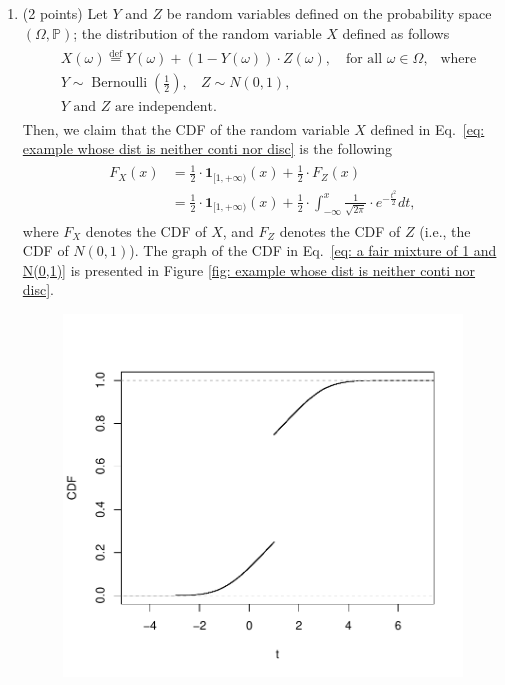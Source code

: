 \documentclass[11pt]{article}
\newcommand{\1}{\mathbbm{1}}
\begin{document}
\begin{enumerate}
\item (2 points) Let $Y$ and $Z$ be random variables defined on the probability space $(\Omega,\mathbb{P})$; the distribution of the random variable $X$ defined as follows
\begin{align}\label{eq: example whose dist is neither conti nor disc}
    \begin{aligned}
    & X(\omega) \overset{\operatorname{def}}{=} Y(\omega)+(1-Y(\omega))\cdot Z(\omega), \ \ \ \text{ for all }\omega\in\Omega,\ \ \mbox{ where} \\
    & Y\sim \operatorname{Bernoulli}\left(\frac{1}{2}\right), \ \ \ \ Z\sim N(0,1), \\
    &\text{$Y$ and $Z$ are independent.}
    \end{aligned}
 \end{align}
Then, we claim that the CDF of the random variable $X$ defined in Eq.~\eqref{eq: example whose dist is neither conti nor disc} is the following
\begin{align}\label{eq: a fair mixture of 1 and N(0,1)}
    \begin{aligned}
        F_X(x) &=\frac{1}{2}\cdot\mathbf{1}_{[1,+\infty)}(x)+ \frac{1}{2}\cdot F_Z(x)\\
    &= \frac{1}{2}\cdot\mathbf{1}_{[1,+\infty)}(x)+ \frac{1}{2}\cdot \int_{-\infty}^x \frac{1}{\sqrt{2\pi}}\cdot e^{-\frac{t^2}{2}} dt,
    \end{aligned}
\end{align}
where $F_X$ denotes the CDF of $X$, and $F_Z$ denotes the CDF of $Z$ (i.e., the CDF of $N(0,1)$). The graph of the CDF in Eq.~\eqref{eq: a fair mixture of 1 and N(0,1)} is presented in Figure \ref{fig: example whose dist is neither conti nor disc}.
\begin{figure}
    \centering
    \includegraphics[scale=0.5]{example whose dist is neither conti nor disc.pdf}

\end{figure}
\end{enumerate}
\end{document}
